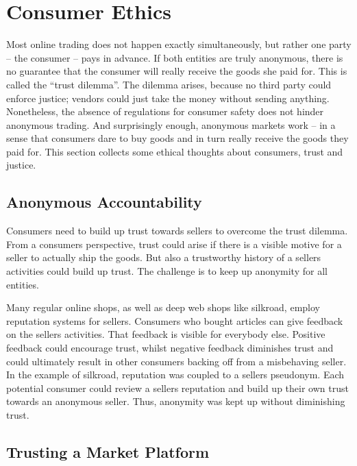 \section{Consumer Ethics}
\label{consumers}

Most online trading does not happen exactly simultaneously, but rather one party -- the consumer -- pays in advance. If both entities are truly anonymous, there is no guarantee that the consumer will really receive the goods she paid for. This is called the ``trust dilemma''\cite{internetTrust2004}. The dilemma arises, because no third party could enforce justice; vendors could just take the money without sending anything. Nonetheless, the absence of regulations for consumer safety does not hinder anonymous trading. And surprisingly enough, anonymous markets work -- in a sense that consumers dare to buy goods and in turn really receive the goods they paid for\cite{silkroad2013}. This section collects some ethical thoughts about consumers, trust and justice. 

\subsection{Anonymous Accountability}

Consumers need to build up trust towards sellers to overcome the trust dilemma\cite{internetTrust2004}. From a consumers perspective, trust could arise if there is a visible motive for a seller to actually ship the goods. But also a trustworthy history of a sellers activities could build up trust. The challenge is to keep up anonymity for all entities.

Many regular online shops, as well as deep web shops like silkroad, employ reputation systems for sellers\cite{internetTrust2004, silkroad2013}. Consumers who bought articles can give feedback on the sellers activities. That feedback is visible for everybody else. Positive feedback could encourage trust, whilst negative feedback diminishes trust and could ultimately result in other consumers backing off from a misbehaving seller\cite{internetTrust2004}. In the example of silkroad, reputation was coupled to a sellers pseudonym\cite{silkroad2013}. Each potential consumer could review a sellers reputation and build up their own trust towards an anonymous seller. Thus, anonymity was kept up without diminishing trust\cite{internetTrust2004}.

\subsection{Trusting a Market Platform}

